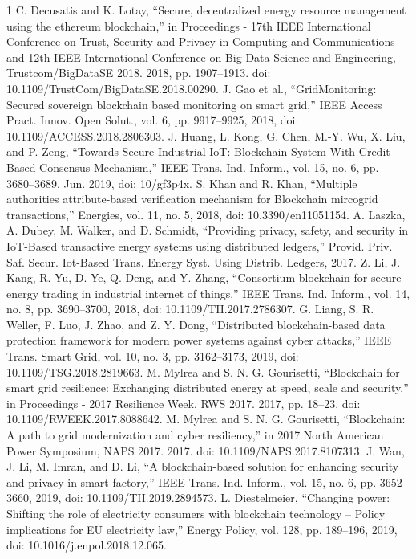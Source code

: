 \documentclass[lettersize,journal]{IEEEtran}
\begin{document}
\begin{thebibliography}{1}
\bibitem{}C. Decusatis and K. Lotay, “Secure, decentralized energy resource management using the ethereum blockchain,” in Proceedings - 17th IEEE International Conference on Trust, Security and Privacy in Computing and Communications and 12th IEEE International Conference on Big Data Science and Engineering, Trustcom/BigDataSE 2018. 2018, pp. 1907–1913. doi: 10.1109/TrustCom/BigDataSE.2018.00290.
\bibitem{}J. Gao et al., “GridMonitoring: Secured sovereign blockchain based monitoring on smart grid,” IEEE Access Pract. Innov. Open Solut., vol. 6, pp. 9917–9925, 2018, doi: 10.1109/ACCESS.2018.2806303.
\bibitem{}J. Huang, L. Kong, G. Chen, M.-Y. Wu, X. Liu, and P. Zeng, “Towards Secure Industrial IoT: Blockchain System With Credit-Based Consensus Mechanism,” IEEE Trans. Ind. Inform., vol. 15, no. 6, pp. 3680–3689, Jun. 2019, doi: 10/gf3p4x.
\bibitem{}S. Khan and R. Khan, “Multiple authorities attribute-based verification mechanism for Blockchain mircogrid transactions,” Energies, vol. 11, no. 5, 2018, doi: 10.3390/en11051154.
\bibitem{}A. Laszka, A. Dubey, M. Walker, and D. Schmidt, “Providing privacy, safety, and security in IoT-Based transactive energy systems using distributed ledgers,” Provid. Priv. Saf. Secur. Iot-Based Trans. Energy Syst. Using Distrib. Ledgers, 2017.
\bibitem{}Z. Li, J. Kang, R. Yu, D. Ye, Q. Deng, and Y. Zhang, “Consortium blockchain for secure energy trading in industrial internet of things,” IEEE Trans. Ind. Inform., vol. 14, no. 8, pp. 3690–3700, 2018, doi: 10.1109/TII.2017.2786307.
\bibitem{}G. Liang, S. R. Weller, F. Luo, J. Zhao, and Z. Y. Dong, “Distributed blockchain-based data protection framework for modern power systems against cyber attacks,” IEEE Trans. Smart Grid, vol. 10, no. 3, pp. 3162–3173, 2019, doi: 10.1109/TSG.2018.2819663.
\bibitem{}M. Mylrea and S. N. G. Gourisetti, “Blockchain for smart grid resilience: Exchanging distributed energy at speed, scale and security,” in Proceedings - 2017 Resilience Week, RWS 2017. 2017, pp. 18–23. doi: 10.1109/RWEEK.2017.8088642.
\bibitem{}M. Mylrea and S. N. G. Gourisetti, “Blockchain: A path to grid modernization and cyber resiliency,” in 2017 North American Power Symposium, NAPS 2017. 2017. doi: 10.1109/NAPS.2017.8107313.
\bibitem{}J. Wan, J. Li, M. Imran, and D. Li, “A blockchain-based solution for enhancing security and privacy in smart factory,” IEEE Trans. Ind. Inform., vol. 15, no. 6, pp. 3652–3660, 2019, doi: 10.1109/TII.2019.2894573.
\bibitem{}L. Diestelmeier, “Changing power: Shifting the role of electricity consumers with blockchain technology – Policy implications for EU electricity law,” Energy Policy, vol. 128, pp. 189–196, 2019, doi: 10.1016/j.enpol.2018.12.065.

\end{thebibliography}
\end{document}
